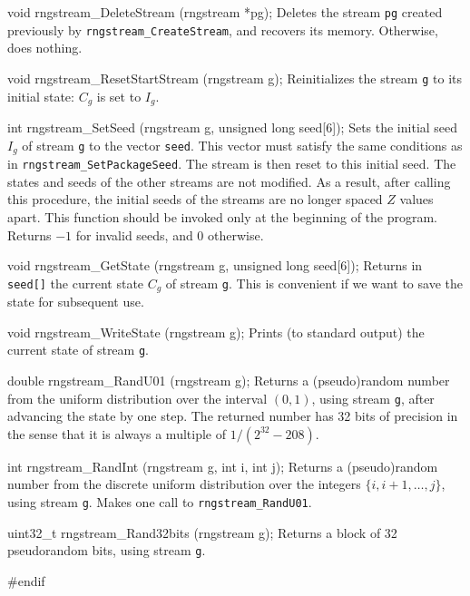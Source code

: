 void rngstream_DeleteStream (rngstream *pg);
\endcode
 \tab Deletes the stream {\tt *pg} created previously 
  by {\tt rngstream\_CreateStream}, and recovers its memory.
  Otherwise, does nothing. 
 \endtab
\code

void rngstream_ResetStartStream (rngstream g);
\endcode
 \tab Reinitializes the stream {\tt g} to its initial state:
   $C_g$ is set to $I_g$.
 \endtab
\code

int rngstream_SetSeed (rngstream g, unsigned long seed[6]);
\endcode
 \tab  Sets the initial seed $I_g$ of stream {\tt g}
  to the vector {\tt seed}.  This vector must satisfy the same 
  conditions as in {\tt rngstream\_SetPackageSeed}.
  The stream is then reset to this initial seed.
  The states and seeds of the other streams are not modified.
  As a result, after calling this procedure, the initial seeds
  of the streams are no longer spaced $Z$ values apart.
  This function should be invoked only at the beginning of the program. 
  Returns $-1$ for invalid seeds, and 0 otherwise.
 \endtab
\code

void rngstream_GetState (rngstream g, unsigned long seed[6]);
\endcode
 \tab Returns in {\tt seed[]} the current state $C_g$ of stream {\tt g}.
  This is convenient if we want to save the state for subsequent use.  
 \endtab
\code

void rngstream_WriteState (rngstream g);
\endcode
 \tab Prints (to standard output) the current state of stream {\tt g}.
 \endtab
\code

double rngstream_RandU01 (rngstream g);
\endcode
 \tab Returns a (pseudo)random number from the uniform distribution
   over the interval $(0,1)$, using stream {\tt g}, 
   after advancing the state by one step.  
   The returned number has 32 bits of precision in the sense that it is
   always a multiple of $1/(2^{32}-208)$.
 \endtab
\code

int rngstream_RandInt (rngstream g, int i, int j);
\endcode
 \tab Returns a (pseudo)random number from the discrete uniform 
   distribution over the integers $\{i,i+1,\dots,j\}$, using stream {\tt g}.  
   Makes one call to {\tt rngstream\_RandU01}.
 \endtab
\code

uint32_t rngstream_Rand32bits (rngstream g);
\endcode
 \tab Returns a block of 32 pseudorandom bits, using stream {\tt g}.  
 \endtab
\code\hide

#endif
\endhide
\endcode


